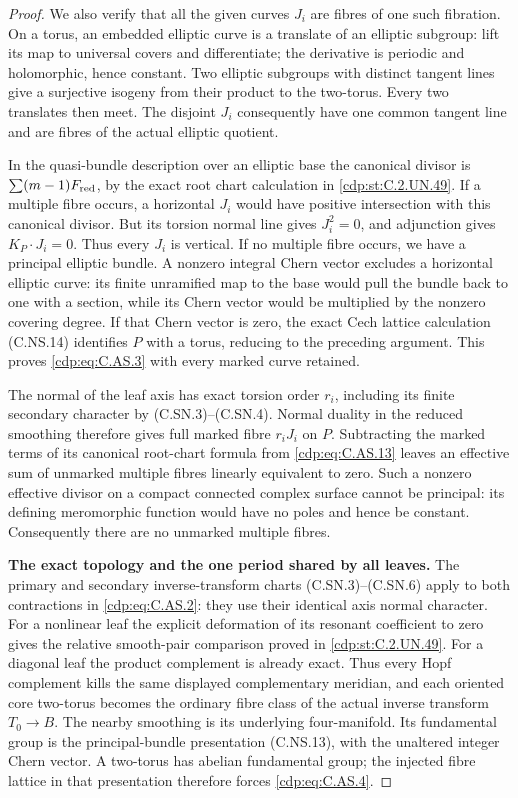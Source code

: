 \begin{proof}
We also verify that all the given curves
$J_i$ are fibres of one such fibration.
On a torus, an embedded elliptic curve is a
translate of an elliptic subgroup: lift its
map to universal covers and differentiate;
the derivative is periodic and holomorphic,
hence constant. Two elliptic subgroups with
distinct tangent lines give a surjective
isogeny from their product to the two-torus.
Every two translates then meet. The disjoint
$J_i$ consequently have one common tangent
line and are fibres of the actual elliptic
quotient.

In the quasi-bundle description over an
elliptic base the canonical divisor is
$\sum(m-1)F_{\rm red}$, by the exact root
chart calculation in \ref{cdp:st:C.2.UN.49}.
If a multiple fibre occurs, a horizontal
$J_i$ would have positive intersection with
this canonical divisor. But its torsion
normal line gives $J_i^2=0$, and adjunction
gives $K_P\cdot J_i=0$. Thus every $J_i$
is vertical. If no multiple fibre occurs,
we have a principal elliptic bundle.
A nonzero integral Chern vector excludes
a horizontal elliptic curve: its finite
unramified map to the base would pull the
bundle back to one with a section, while
its Chern vector would be multiplied by
the nonzero covering degree. If that Chern
vector is zero, the exact Cech lattice
calculation (C.NS.14) identifies $P$ with
a torus, reducing to the preceding argument.
This proves \eqref{cdp:eq:C.AS.3} with every marked
curve retained.

The normal of the leaf axis has exact
torsion order $r_i$, including its finite
secondary character by (C.SN.3)--(C.SN.4).
Normal duality in the reduced smoothing
therefore gives full marked fibre $r_iJ_i$
on $P$. Subtracting the marked terms of
its canonical root-chart formula from
\eqref{cdp:eq:C.AS.13} leaves an effective sum of
unmarked multiple fibres linearly
equivalent to zero. Such a nonzero
effective divisor on a compact connected
complex surface cannot be principal:
its defining meromorphic function would
have no poles and hence be constant.
Consequently there are no unmarked
multiple fibres.

\par\medskip\noindent\textbf{The exact topology and the one period shared by all leaves.}
The primary and secondary inverse-transform
charts (C.SN.3)--(C.SN.6) apply to both
contractions in \eqref{cdp:eq:C.AS.2}: they use their
identical axis normal character. For a
nonlinear leaf the explicit deformation
of its resonant coefficient to zero gives
the relative smooth-pair comparison
proved in \ref{cdp:st:C.2.UN.49}. For a diagonal leaf
the product complement is already exact.
Thus every Hopf complement kills the
same displayed complementary meridian,
and each oriented core two-torus becomes
the ordinary fibre class of the actual
inverse transform $T_0\to B$.
The nearby smoothing is its underlying
four-manifold. Its fundamental group is
the principal-bundle presentation
(C.NS.13), with the unaltered integer
Chern vector. A two-torus has abelian
fundamental group; the injected fibre
lattice in that presentation therefore
forces \eqref{cdp:eq:C.AS.4}.


\end{proof}
